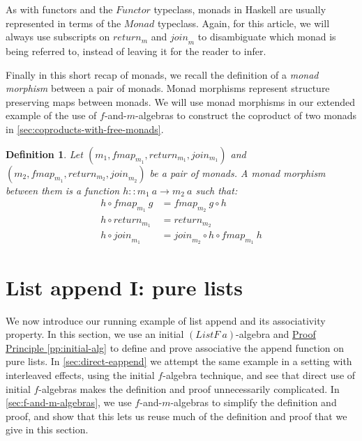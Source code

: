 \documentclass{jfp1}
\newtheorem{definition}{Definition}
\newcommand{\proofprinref}[1]{\hyperref[#1]{Proof Principle \ref*{#1}}}
\begin{document}
As with functors and the $\mathit{Functor}$ typeclass, monads in
Haskell are usually represented in terms of the $\textit{Monad}$
typeclass. Again, for this article, we will always use subscripts on
$\mathit{return}_m$ and $\mathit{join}_m$ to disambiguate which monad
is being referred to, instead of leaving it for the reader to infer.

Finally in this short recap of monads, we recall the definition of a
\emph{monad morphism} between a pair of monads. Monad morphisms
represent structure preserving maps between monads. We will use monad
morphisms in our extended example of the use of $f$-and-$m$-algebras
to construct the coproduct of two monads in
\autoref{sec:coproducts-with-free-monads}.

\begin{definition}
  Let $(m_1, \mathit{fmap_{m_1}}, \mathit{return}_{m_1},
  \mathit{join_{m_1}})$ and $(m_2, \mathit{fmap_{m_1}},
  \mathit{return}_{m_2}, \mathit{join}_{m_2})$ be a pair of monads. A
  \emph{monad morphism} between them is a function $h :: m_1~a \to
  m_2~a$ such that:
  \begin{align}
    \label{eq:monad-mor-natural}
    h \circ \mathit{fmap}_{m_1}~g & = \mathit{fmap}_{m_2}~g \circ h \\
    \label{eq:monad-mor-return}
    h \circ \mathit{return}_{m_1} & = \mathit{return}_{m_2} \\
    \label{eq:monad-mor-join}
    h \circ \mathit{join}_{m_1} & = \mathit{join}_{m_2} \circ h \circ \mathit{fmap}_{m_1}~h
  \end{align}
\end{definition}

\section{List append I: pure lists}
\label{sec:pure-append}

We now introduce our running example of list append and its
associativity property. In this section, we use an initial
$(\mathit{ListF}~a)$-algebra and \proofprinref{pp:initial-alg} to
define and prove associative the append function on pure lists. In
\autoref{sec:direct-eappend} we attempt the same example in a setting
with interleaved effects, using the initial $f$-algebra technique, and
see that direct use of initial $f$-algebras makes the definition and
proof unnecessarily complicated. In \autoref{sec:f-and-m-algebras}, we
use $f$-and-$m$-algebras to simplify the definition and proof, and
show that this lets us reuse much of the definition and proof that we
give in this section.
\end{document}
